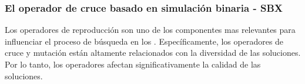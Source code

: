 \subsubsection{El operador de cruce basado en simulación binaria - SBX}

Los operadores de reproducción son uno de los componentes mas relevantes para influenciar el proceso de búsqueda en los \EAS{}.
%
Específicamente, los operadores de cruce y mutación están altamente relacionados con la diversidad de las soluciones.
%
Por lo tanto, los operadores afectan significativamente la calidad de las soluciones.
%

